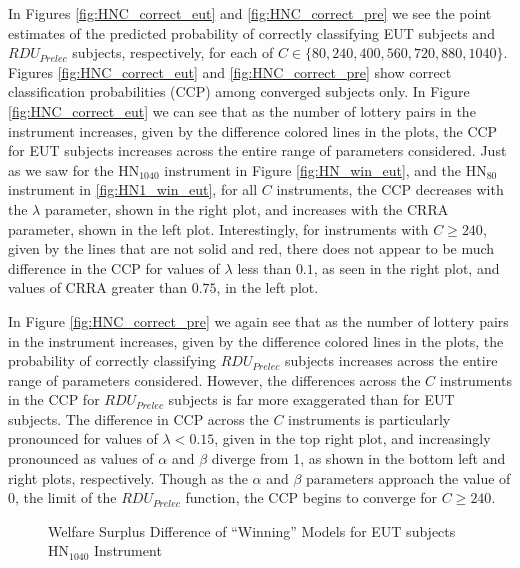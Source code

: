 \documentclass[../main.tex]{subfiles}
\begin{document}
In Figures \ref{fig:HNC_correct_eut} and \ref{fig:HNC_correct_pre} we see the point estimates of the predicted probability of correctly classifying EUT subjects and $\mathit{RDU_{Prelec}}$ subjects, respectively, for each of $C \in \lbrace 80, 240, 400, 560, 720, 880, 1040 \rbrace$.
Figures \ref{fig:HNC_correct_eut} and \ref{fig:HNC_correct_pre} show correct classification probabilities (CCP) among converged subjects only.
In Figure \ref{fig:HNC_correct_eut} we can see that as the number of lottery pairs in the instrument increases, given by the difference colored lines in the plots, the CCP for EUT subjects increases across the entire range of parameters considered.
Just as we saw for the $\text{HN}_{1040}$ instrument in Figure \ref{fig:HN_win_eut}, and the $\text{HN}_{80}$ instrument in \ref{fig:HN1_win_eut}, for all $C$ instruments, the CCP decreases with the $\lambda$ parameter, shown in the right plot, and increases with the CRRA parameter, shown in the left plot.
Interestingly, for instruments with $C \geq 240$, given by the lines that are not solid and red, there does not appear to be much difference in the CCP for values of $\lambda$ less than $0.1$, as seen in the right plot, and values of CRRA greater than $0.75$, in the left plot.

In Figure \ref{fig:HNC_correct_pre} we again see that as the number of lottery pairs in the instrument increases, given by the difference colored lines in the plots, the probability of correctly classifying $\mathit{RDU_{Prelec}}$ subjects increases across the entire range of parameters considered.
However, the differences across the $C$ instruments in the CCP for $\mathit{RDU_{Prelec}}$ subjects is far more exaggerated than for EUT subjects.
The difference in CCP across the $C$ instruments is particularly pronounced for values of $\lambda < 0.15$, given in the top right plot, and increasingly pronounced as values of $\alpha$ and $\beta$ diverge from 1, as shown in the bottom left and right plots, respectively.
Though as the $\alpha$ and $\beta$ parameters approach the value of 0, the limit of the $\mathit{RDU_{Prelec}}$ function, the CCP begins to converge for $C \geq 240$.

\begin{figure}[h!]
	\center
	\caption{Welfare Surplus Difference of \enquote{Winning} Models for EUT subjects\\$\text{HN}_{1040}$ Instrument}
	\label{fig:HN_wel_eut}
\end{figure}
\end{document}
